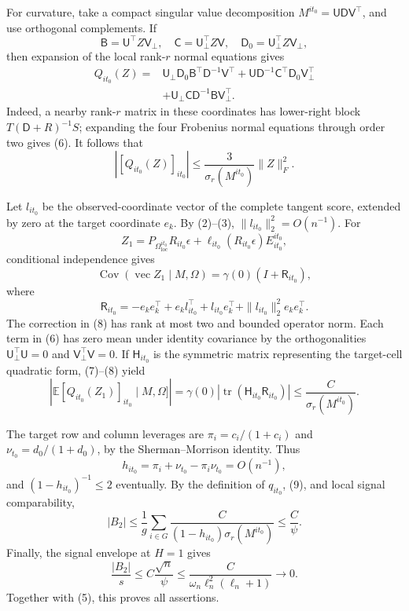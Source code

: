 For curvature, take a compact singular value decomposition
\(M^{it_0}=\mathsf U\mathsf D\mathsf V^{\top}\), and use orthogonal complements.  If
\[
 \mathsf B=\mathsf U^{\top}Z\mathsf V_\perp,
 \quad \mathsf C=\mathsf U_\perp^{\top}Z\mathsf V,
 \quad \mathsf D_0=\mathsf U_\perp^{\top}Z\mathsf V_\perp,
\]
then expansion of the local rank-\(r\) normal equations gives
\[
 \begin{aligned}
 Q_{it_0}(Z)={}&
 \mathsf U_\perp\mathsf D_0\mathsf B^{\top}\mathsf D^{-1}\mathsf V^{\top}
 +\mathsf U\mathsf D^{-1}\mathsf C^{\top}\mathsf D_0\mathsf V_\perp^{\top}\\
 &+\mathsf U_\perp\mathsf C\mathsf D^{-1}\mathsf B\mathsf V_\perp^{\top}.
 \end{aligned}
 \tag{6}
\]
Indeed, a nearby rank-\(r\) matrix in these coordinates has lower-right block \(T(\mathsf D+R)^{-1}S\); expanding the four Frobenius normal equations through order two gives (6).  It follows that
\[
 |[Q_{it_0}(Z)]_{it_0}|
 \le\frac{3}{\sigma_r(M^{it_0})}\|Z\|_F^2.
 \tag{7}
\]

Let \(l_{it_0}\) be the observed-coordinate vector of the complete tangent score, extended by zero at the target coordinate \(e_k\).  By (2)--(3), \(\|l_{it_0}\|_2^2=O(n^{-1})\).  For
\[
 Z_1=P_{\Omega_{\mathrm{loc}}^{it_0}}R_{it_0}\epsilon
 +\ell_{it_0}(R_{it_0}\epsilon)E^{it_0}_{it_0},
\]
conditional independence gives
\[
 \operatorname{Cov}(\operatorname{vec}Z_1\mid M,\Omega)
 =\gamma(0)(I+\mathsf R_{it_0}),
\]
where
\[
 \mathsf R_{it_0}=-e_ke_k^{\top}+e_kl_{it_0}^{\top}
 +l_{it_0}e_k^{\top}+\|l_{it_0}\|_2^2e_ke_k^{\top}.
 \tag{8}
\]
The correction in (8) has rank at most two and bounded operator norm.  Each term in (6) has zero mean under identity covariance by the orthogonalities \(\mathsf U_\perp^{\top}\mathsf U=0\) and \(\mathsf V_\perp^{\top}\mathsf V=0\).  If \(\mathsf H_{it_0}\) is the symmetric matrix representing the target-cell quadratic form, (7)--(8) yield
\[
 |\mathbb E[Q_{it_0}(Z_1)]_{it_0}\mid M,\Omega]|
 =\gamma(0)|\operatorname{tr}(\mathsf H_{it_0}\mathsf R_{it_0})|
 \le\frac{C}{\sigma_r(M^{it_0})}.
 \tag{9}
\]

The target row and column leverages are \(\pi_i=c_i/(1+c_i)\) and \(\nu_{t_0}=d_0/(1+d_0)\), by the Sherman--Morrison identity.  Thus
\[
 h_{it_0}=\pi_i+\nu_{t_0}-\pi_i\nu_{t_0}=O(n^{-1}),
\]
and \((1-h_{it_0})^{-1}\le2\) eventually.  By the definition of \(q_{it_0}\), (9), and local signal comparability,
\[
 |B_2|\le\frac1g\sum_{i\in G}
 \frac{C}{(1-h_{it_0})\sigma_r(M^{it_0})}
 \le\frac{C}{\psi}.
 \tag{10}
\]
Finally, the signal envelope at \(H=1\) gives
\[
 \frac{|B_2|}{s}
 \le C\frac{\sqrt n}{\psi}
 \le\frac{C}{\omega_n\ell_n^2(\ell_n+1)}\longrightarrow0.
\]
Together with (5), this proves all assertions.

